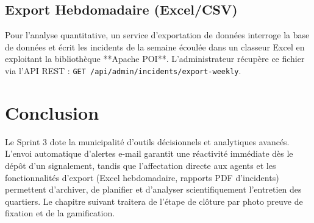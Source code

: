 \subsection{Export Hebdomadaire (Excel/CSV)}
Pour l'analyse quantitative, un service d'exportation de données interroge la base de données et écrit les incidents de la semaine écoulée dans un classeur Excel en exploitant la bibliothèque **Apache POI**. L'administrateur récupère ce fichier via l'API REST :
\texttt{GET /api/admin/incidents/export-weekly}.

\section*{Conclusion}
Le Sprint 3 dote la municipalité d'outils décisionnels et analytiques avancés. L'envoi automatique d'alertes e-mail garantit une réactivité immédiate dès le dépôt d'un signalement, tandis que l'affectation directe aux agents et les fonctionnalités d'export (Excel hebdomadaire, rapports PDF d'incidents) permettent d'archiver, de planifier et d'analyser scientifiquement l'entretien des quartiers. Le chapitre suivant traitera de l'étape de clôture par photo preuve de fixation et de la gamification.
